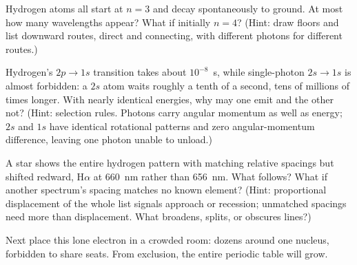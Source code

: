 \begin{puzzles}
\item Hydrogen atoms all start at \(n=3\) and decay spontaneously to ground. At most how many wavelengths appear? What if initially \(n=4\)? (Hint: draw floors and list downward routes, direct and connecting, with different photons for different routes.)
\item Hydrogen's \(2p\to1s\) transition takes about \(10^{-8}\)~s, while single-photon \(2s\to1s\) is almost forbidden: a \(2s\) atom waits roughly a tenth of a second, tens of millions of times longer. With nearly identical energies, why may one emit and the other not? (Hint: selection rules. Photons carry angular momentum as well as energy; \(2s\) and \(1s\) have identical rotational patterns and zero angular-momentum difference, leaving one photon unable to unload.)
\item A star shows the entire hydrogen pattern with matching relative spacings but shifted redward, H\(\alpha\) at 660~nm rather than 656~nm. What follows? What if another spectrum's spacing matches no known element? (Hint: proportional displacement of the whole list signals approach or recession; unmatched spacings need more than displacement. What broadens, splits, or obscures lines?)
\end{puzzles}

Next place this lone electron in a crowded room: dozens around one nucleus, forbidden to share seats. From exclusion, the entire periodic table will grow.
